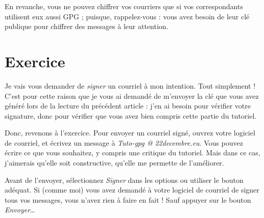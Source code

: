 En revanche, vous ne pouvez chiffrer vos courriers que si vos
correspondants utilisent eux aussi GPG ; puisque, rappelez-vous : vous
avez besoin de leur clé publique pour chiffrer des messages à leur
attention.

\section{Exercice}\label{exercice}

Je vais vous demander de \emph{signer} un courriel à
mon intention. Tout simplement ! C'est pour cette raison que je vous ai demandé de m'envoyer la clé que
vous avez généré lors de la lecture du précédent article : j'en ai
besoin pour vérifier votre signature, donc pour vérifier que vous avez
bien compris cette partie du tutoriel.

Donc, revenons à l'exercice. Pour envoyer un courriel signé, ouvrez
votre logiciel de courriel, et écrivez un message à \emph{Tuto-gpg @
22decembre.eu}. Vous pouvez écrire ce que vous souhaitez, y compris une critique du
tutoriel. Mais dans ce cas, j'aimerais qu'elle soit constructive,
qu'elle me permette de l'améliorer.

Avant de l'envoyer, sélectionnez \emph{Signer} dans les options ou
utiliser le bouton adéquat. Si (comme moi) vous avez demandé à votre
logiciel de courriel de signer tous vos messages, vous n'avez rien à
faire en fait ! Sauf appuyer sur le bouton \emph{Envoyer}\ldots{}